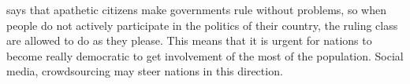 \documentclass[letterpaper,10pt]{article}
\begin{document}
\cite{sartori2003} says that apathetic citizens make governments rule without problems, so when people do not actively participate in the politics of their country, the ruling class are allowed to do as they please. This means that it is urgent for nations to become really democratic to get involvement of the most of the population. Social media, crowdsourcing may steer nations in this direction.



\end{document}
